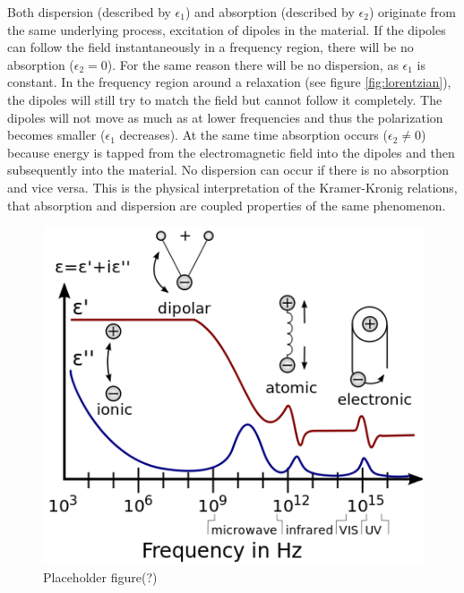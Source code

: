 Both dispersion (described by $\epsilon_1$) and absorption (described by $\epsilon_2$) originate from the same underlying process, excitation of dipoles in the material. If the dipoles can follow the field instantaneously in a frequency region, there will be no absorption ($\epsilon_2 = 0$). For the same reason there will be no dispersion, as $\epsilon_1$ is constant. In the frequency region around a relaxation (see figure \ref{fig:lorentzian}), the dipoles will still try to match the field but cannot follow it completely. The dipoles will not move as much as at lower frequencies and thus the polarization becomes smaller ($\epsilon_1$ decreases). At the same time absorption occurs ($\epsilon_2 \neq 0$) because energy is tapped from the electromagnetic field into the dipoles and then subsequently into the material. No dispersion can occur if there is no absorption and vice versa. This is the physical interpretation of the Kramer-Kronig relations, that absorption and dispersion are coupled properties of the same phenomenon. 

\begin{figure}
    \centering 
    \includegraphics[scale=0.4]{figures/Ch2/DielectricResponses.png}
    \caption{Placeholder figure(?)}
    \label{fig:dielectricresponses}
\end{figure}

